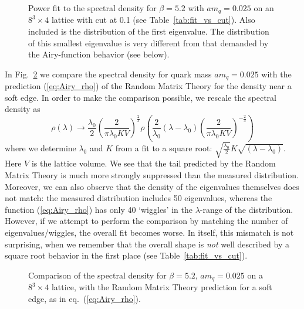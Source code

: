 \documentclass[11pt]{article}
\newcommand{\beq}{\begin{equation}}
\newcommand{\eeq}{\end{equation}}
\newcommand{\noi}{\vspace{12pt}\noindent}
\begin{document}
\begin{figure}
\begin{center}
\textwidth
{}
\end{center}
\vspace*{-2mm}
\caption[a]{Power fit to the spectral density for $\beta=5.2$ with $am_q=0.025$
on an $8^3 \times 4$ lattice with cut at 0.1 (see Table~\ref{tab:fit_vs_cut}). 
Also included is the distribution of the first eigenvalue. The distribution
of this smallest eigenvalue is very different from that demanded by
the Airy-function behavior (see below).}
\label{fig:sqrt_fit}
\end{figure}


\noi
In Fig.~\ref{fig:Airy_compare} we compare the spectral density for
quark mass $am_q=0.025$ with the prediction
(\ref{eq:Airy_rho}) of the Random Matrix Theory for the density near
a soft edge.  In order to make the comparison possible, we rescale 
the spectral density as
\beq
\rho(\lambda)\rightarrow \frac{\lambda_0}{2}\left(\frac{2}{\pi\lambda_0 KV}
\right)^{\frac{2}{3}}\rho\left(\frac{2}{\lambda_0}(\lambda-\lambda_0)\left(
\frac{2}{\pi\lambda_0 KV}\right)^{-\frac{2}{3}}\right)
\eeq
where we determine $\lambda_0$ and $K$ from a fit to a square root:
$\sqrt{\frac{\lambda_0}{2}}K\sqrt{(\lambda-\lambda_0)}$.  Here $V$ is
the lattice volume.  We see that the tail predicted by the Random
Matrix Theory is much more strongly suppressed than the measured
distribution.  Moreover, we can also observe that the density of the
eigenvalues themselves does not match: the measured distribution
includes 50 eigenvalues, whereas the function (\ref{eq:Airy_rho}) has
only 40 `wiggles' in the $\lambda$-range of the distribution.
However, if we attempt to perform the comparison by matching the
number of eigenvalues/wiggles, the overall fit becomes worse.  In
itself, this mismatch is not surprising, when we remember that the
overall shape is {\em not} well described by a square root behavior
in the first place (see Table~\ref{tab:fit_vs_cut}).


\begin{figure}
\begin{center}
\textwidth
{}
\end{center}
\vspace*{-2mm}
\caption[a]{Comparison of the spectral density for $\beta=5.2$, $am_q=0.025$ 
on a $8^3\times4$ lattice, with the Random Matrix Theory prediction
for a soft edge, as in eq.~(\protect\ref{eq:Airy_rho}).}
\label{fig:Airy_compare}
\end{figure}
\end{document}
